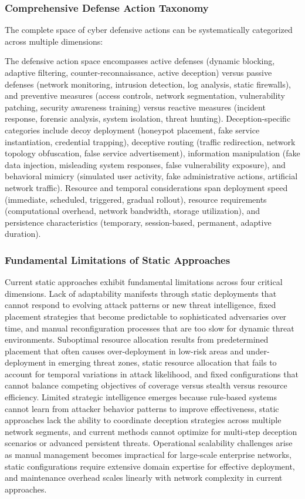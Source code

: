 \documentclass[12pt,oneside]{article}
\begin{document}
\subsubsection{Comprehensive Defense Action Taxonomy}

The complete space of cyber defensive actions can be systematically categorized across multiple dimensions:

The defensive action space encompasses active defenses (dynamic blocking, adaptive filtering, counter-reconnaissance, active deception) versus passive defenses (network monitoring, intrusion detection, log analysis, static firewalls), and preventive measures (access controls, network segmentation, vulnerability patching, security awareness training) versus reactive measures (incident response, forensic analysis, system isolation, threat hunting). Deception-specific categories include decoy deployment (honeypot placement, fake service instantiation, credential trapping), deceptive routing (traffic redirection, network topology obfuscation, false service advertisement), information manipulation (fake data injection, misleading system responses, false vulnerability exposure), and behavioral mimicry (simulated user activity, fake administrative actions, artificial network traffic). Resource and temporal considerations span deployment speed (immediate, scheduled, triggered, gradual rollout), resource requirements (computational overhead, network bandwidth, storage utilization), and persistence characteristics (temporary, session-based, permanent, adaptive duration).

\subsubsection{Fundamental Limitations of Static Approaches}

Current static approaches exhibit fundamental limitations across four critical dimensions. Lack of adaptability manifests through static deployments that cannot respond to evolving attack patterns or new threat intelligence, fixed placement strategies that become predictable to sophisticated adversaries over time, and manual reconfiguration processes that are too slow for dynamic threat environments. Suboptimal resource allocation results from predetermined placement that often causes over-deployment in low-risk areas and under-deployment in emerging threat zones, static resource allocation that fails to account for temporal variations in attack likelihood, and fixed configurations that cannot balance competing objectives of coverage versus stealth versus resource efficiency. Limited strategic intelligence emerges because rule-based systems cannot learn from attacker behavior patterns to improve effectiveness, static approaches lack the ability to coordinate deception strategies across multiple network segments, and current methods cannot optimize for multi-step deception scenarios or advanced persistent threats. Operational scalability challenges arise as manual management becomes impractical for large-scale enterprise networks, static configurations require extensive domain expertise for effective deployment, and maintenance overhead scales linearly with network complexity in current approaches.
\end{document}
